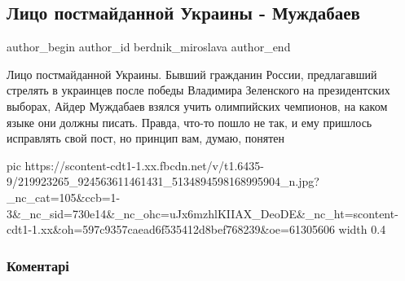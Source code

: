  
 
 
 
 
 
\subsection{Лицо постмайданной Украины - Муждабаев}
\label{sec:26_07_2021.fb.berdnik_miroslava.5.muzhdabajev_bilodid}
 
\ifcmt
 author_begin
   author_id berdnik_miroslava
 author_end
\fi

Лицо постмайданной Украины.   Бывший гражданин России, предлагавший стрелять в
украинцев после победы Владимира Зеленского на президентских выборах,  Айдер
Муждабаев взялся учить олимпийских чемпионов, на каком языке они должны писать.
Правда, что-то пошло не так, и ему пришлось исправлять свой пост, но принцип
вам, думаю, понятен

\ifcmt
  pic https://scontent-cdt1-1.xx.fbcdn.net/v/t1.6435-9/219923265_924563611461431_5134894598168995904_n.jpg?_nc_cat=105&ccb=1-3&_nc_sid=730e14&_nc_ohc=uJx6mzhlKIIAX_DeoDE&_nc_ht=scontent-cdt1-1.xx&oh=597c9357caead6f535412d8bef768239&oe=61305606
  width 0.4
\fi

\subsubsection{Коментарі}

